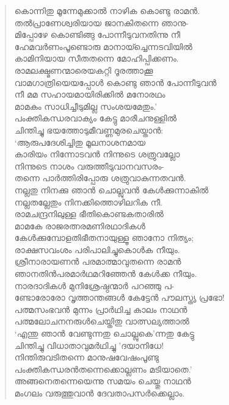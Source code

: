 \begin{verse}
കൊന്നിതു മൂന്നേമുക്കാല്‍ നാഴിക കൊണ്ടു രാമന്‍.\\
തല്‍പ്രാണേശ്വരിയായ ജാനകിതന്നെ ഞാനു-\\
മിപ്പോഴേ കൊണ്ടിങ്ങു പോന്നീടുവനതിന്നു നീ\\
ഹേമവര്‍ണംപൂണ്ടൊരു മാനായ്ച്ചെന്നടവിയില്‍\\
കാമിനിയായ സീതതന്നെ മോഹിപ്പിക്കണം.\\
രാമലക്ഷ്മണന്മാരെയകറ്റി ദൂരത്താക്കൂ\\
വാമഗാത്രിയെയപ്പോള്‍ കൊണ്ടു ഞാന്‍ പോന്നീടുവന്‍\\
നീ മമ സഹായമായിരിക്കില്‍ മനോരഥം\\
മാമകം സാധിച്ചീടുമില്ല സംശയമേതും.’\\
പംക്തികന്ധരവാക്യം കേട്ടു മാരീചനുള്ളില്‍\\
ചിന്തിച്ചു ഭയത്തോടുമീവണ്ണമുരചെയ്താന്‍:\\
‘ആരുപദേശിച്ചിതു മൂലനാശനമായ\\
കാരിയം നിന്നോടവന്‍ നിന്നുടെ ശത്രുവല്ലോ\\
നിന്നുടെ നാശം വരുത്തീടുവാനവസരം-\\
തന്നെ പാര്‍ത്തിരിപ്പോരു ശത്രുവാകുന്നതവന്‍.\\
നല്ലതു നിനക്കു ഞാന്‍ ചൊല്ലുവന്‍ കേള്‍ക്കുന്നാകില്‍\\
നല്ലതല്ലേതും നിനക്കിത്തൊഴിലറിക നീ.\\
രാമചന്ദ്രനിലുള്ള ഭീതികൊണ്ടകതാരില്‍\\
മാമകേ രാജരത്നരമണിരഥാദികള്‍\\
കേള്‍ക്കുമ്പോളതിഭീതനായുള്ളൂ ഞാനോ നിത്യം;\\
രാക്ഷസവംശം പരിപാലിച്ചുകൊള്‍ക നീയും.\\
ശ്രീനാരായണന്‍ പരമാത്മാവുതന്നെ രാമന്‍\\
ഞാനതിന്‍പരമാര്‍ഥമറിഞ്ഞേന്‍ കേള്‍ക്ക നീയും.\\
നാരദാദികള്‍ മുനിശ്രേഷ്ഠന്മാര്‍ പറഞ്ഞു പ-\\
ണ്ടോരോരോ വൃത്താന്തങ്ങള്‍ കേട്ടേന്‍ പൗലസ്ത്യ പ്രഭോ!\\
പത്മസംഭവന്‍ മുന്നം പ്രാര്‍ഥിച്ച കാലം നാഥന്‍\\
പത്മലോചനനരുള്‍ചെയ്തിതു വാത്സല്യത്താല്‍\\
‘എന്തു ഞാന്‍ വേണ്ടുന്നതു ചൊല്ലുകെ’ന്നതു കേട്ടു\\
ചിന്തിച്ചു വിധാതാവുമര്‍ഥിച്ചു ’ദയാനിധേ!\\
നിന്തിരുവടിതന്നെ മാനുഷവേഷംപൂണ്ടു\\
പംക്തികന്ധരന്‍തന്നെക്കൊല്ലണം മടിയാതെ.’\\
അങ്ങനെതന്നെയെന്നു സമയം ചെയ്തു നാഥന്‍\\
മംഗലം വരുത്തുവാന്‍ ദേവതാപസര്‍ക്കെല്ലാം.\\

\end{verse}
